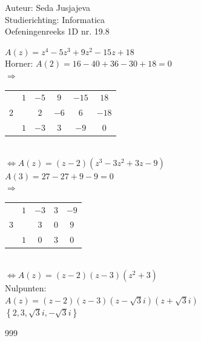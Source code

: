 \documentclass[a4paper]{article}
\begin{document}
\noindent \large Auteur: Seda Jusjajeva\\
\noindent \large Studierichting: Informatica\\
\noindent \large Oefeningenreeks 1D nr. 19.8\\

\medskip

\normalsize

$A(z) = z^4 - 5z^3 + 9z^2 - 15z + 18 $ \\

Horner: $A(2) = 16 - 40 + 36 - 30 + 18 = 0$\\

$\Rightarrow$ \begin{tabular}{c|cccc|c}
        & $1$   & $-5$  & $9$   & $-15$ & $18$ \\
    $2$ &       & $2$   & $-6$  & $6$   & $-18$ \\
\hline
        & $1$   & $-3$  & $3$   & $-9$  & $0$ \\
\end{tabular} \\

$ \Leftrightarrow A(z) = (z - 2)(z^3 - 3z^2 + 3z - 9)$ \\

$A(3) = 27 - 27 + 9 - 9 = 0$\\

$\Rightarrow$ \begin{tabular}{c|ccc|c}
        & $1$   & $-3$  & $3$ & $-9$ \\
    $3$ &       & $3$   & $0$ & $9$ \\ 
\hline
        & $1$   & $0$   & $3$ & $0$ \\
\end{tabular} \\

$\Leftrightarrow A(z) = (z - 2)(z - 3)(z^2 + 3) $ \\

Nulpunten: \\

$A(z) = (z - 2)(z - 3)(z - \sqrt{3}i)(z + \sqrt{3}i)$ \\

$\left\{2, 3, \sqrt{3}i, -\sqrt{3}i\right\}$ \\




\begin{thebibliography}{999}
\end{thebibliography}
\end{document}
